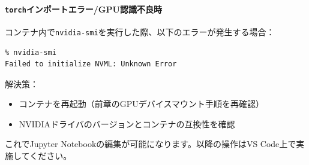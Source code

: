 \paragraph{\texttt{torch}インポートエラー/GPU認識不良時}
コンテナ内で\texttt{nvidia-smi}を実行した際、以下のエラーが発生する場合：
\begin{lstlisting}
% nvidia-smi
Failed to initialize NVML: Unknown Error
\end{lstlisting}

解決策：
\begin{itemize}
\item コンテナを再起動（前章のGPUデバイスマウント手順を再確認）
\item NVIDIAドライバのバージョンとコンテナの互換性を確認
\end{itemize}

これでJupyter Notebookの編集が可能になります。以降の操作はVS Code上で実施してください。
